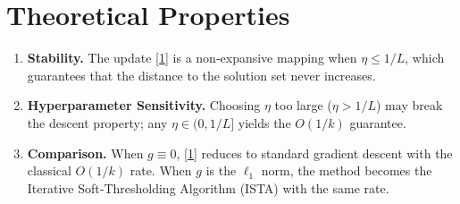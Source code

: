 \documentclass{article}
\begin{document}
\section*{Theoretical Properties}
\begin{enumerate}[noitemsep]
\item \textbf{Stability.} The update \eqref{1} is a non‑expansive mapping when $\eta\le 1/L$, which guarantees that the distance to the solution set never increases.
\item \textbf{Hyperparameter Sensitivity.} Choosing $\eta$ too large ($\eta>1/L$) may break the descent property; any $\eta\in(0,1/L]$ yields the $O(1/k)$ guarantee.
\item \textbf{Comparison.} When $g\equiv0$, \eqref{1} reduces to standard gradient descent with the classical $O(1/k)$ rate. When $g$ is the $\ell_1$ norm, the method becomes the Iterative Soft‑Thresholding Algorithm (ISTA) with the same rate.
\end{enumerate}
\end{document}
